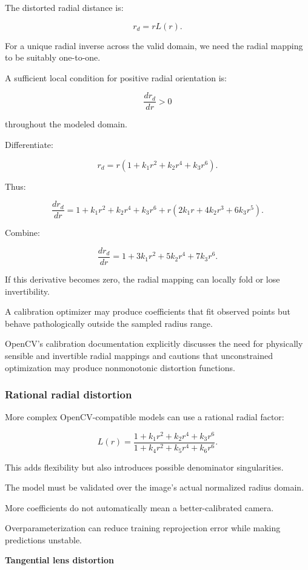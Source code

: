 The distorted radial distance is:

\[
 \boxed{ r_d=rL(r) }.
\]

For a unique radial inverse across the valid domain, we need the radial mapping to be suitably one-to-one.

A sufficient local condition for positive radial orientation is:

\[
 \boxed{ \frac{dr_d}{dr}>0 }
\]

throughout the modeled domain.

Differentiate:

\[
 r_d=r(1+k_1r^2+k_2r^4+k_3r^6).
\]

Thus:

\[
 \frac{dr_d}{dr} = 1+k_1r^2+k_2r^4+k_3r^6 +r(2k_1r+4k_2r^3+6k_3r^5).
\]

Combine:

\[
 \boxed{ \frac{dr_d}{dr} = 1+3k_1r^2+5k_2r^4+7k_3r^6 }.
\]

If this derivative becomes zero, the radial mapping can locally fold or lose invertibility.

A calibration optimizer may produce coefficients that fit observed points but behave pathologically outside the sampled radius range.

OpenCV's calibration documentation explicitly discusses the need for physically sensible and invertible radial mappings and cautions that unconstrained optimization may produce nonmonotonic distortion functions. 

\subsubsection{Rational radial distortion}\label{rational-radial-distortion}

More complex OpenCV-compatible models can use a rational radial factor:

\[
 \boxed{ L(r)= \frac{ 1+k_1r^2+k_2r^4+k_3r^6 }{ 1+k_4r^2+k_5r^4+k_6r^6 } }.
\]

This adds flexibility but also introduces possible denominator singularities.

The model must be validated over the image's actual normalized radius domain.

More coefficients do not automatically mean a better-calibrated camera.

Overparameterization can reduce training reprojection error while making predictions unstable.

\textbf{Tangential lens distortion}

